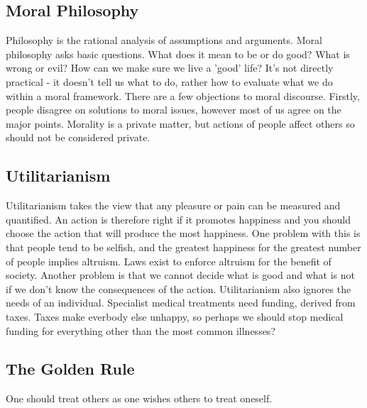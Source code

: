\documentclass{article}
\begin{document}
	\subsection{Moral Philosophy}
	Philosophy is the rational analysis of assumptions and arguments. Moral philosophy asks basic questions. What does it mean to be or do good? What is wrong or evil? How can we make sure we live a 'good' life? It's not directly practical - it doesn't tell us what to do, rather how to evaluate what we do within a moral framework. There are a few objections to moral discourse. Firstly, people disagree on solutions to moral issues, however most of us agree on the major points. Morality is a private matter, but actions of people affect others so should not be considered private.
	
	\subsection{Utilitarianism}
	Utilitarianism takes the view that any pleasure or pain can be measured and quantified. An action is therefore right if it promotes happiness and you should choose the action that will produce the most happiness. One problem with this is that people tend to be selfish, and the greatest happiness for the greatest number of people implies altruism. Laws exist to enforce altruism for the benefit of society. Another problem is that we cannot decide what is good and what is not if we don't know the consequences of the action. Utilitarianism also ignores the needs of an individual. Specialist medical treatments need funding, derived from taxes. Taxes make everbody else unhappy, so perhaps we should stop medical funding for everything other than the most common illnesses? 
	
	\subsection{The Golden Rule}
	One should treat others as one wishes others to treat oneself. 
	
	\newpage
	\printindex	
	
\end{document}
